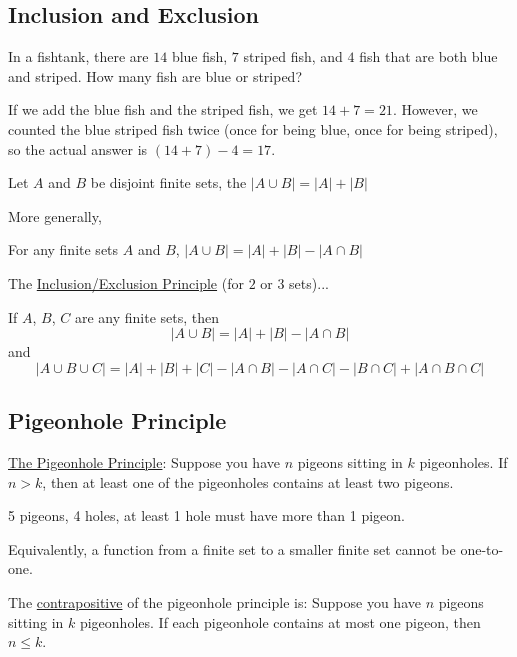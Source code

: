 \subsection{Inclusion and Exclusion}
\begin{example}
    In a fishtank, there are $14$ blue fish, $7$ striped fish, and $4$ fish that are both blue and striped. How many fish are blue or striped?

    If we add the blue fish and the striped fish, we get $14+7=21$. However, we counted the blue striped fish twice (once for being blue, once for being striped), so the actual answer is $(14+7)-4=17$.
\end{example}

\begin{theorm}
    Let $A$ and $B$ be disjoint finite sets, the $|A\cup B| = |A| + |B|$
\end{theorm}

More generally,
\begin{theorm}
    For any finite sets $A$ and $B$, $|A\cup B| = |A|+|B| - |A\cap B|$
\end{theorm}

\begin{definition}
    The \underline{Inclusion/Exclusion Principle} (for $2$ or $3$ sets)...

    If $A$, $B$, $C$ are any finite sets, then
    $$|A\cup B| = |A| + |B| - |A\cap B|$$
    and
    $$|A\cup B\cup C| = |A| + |B| + |C| - |A\cap B| - |A\cap C| - |B\cap C| + |A\cap B\cap C|$$
\end{definition}

\subsection{Pigeonhole Principle}
\begin{definition}
    \underline{The Pigeonhole Principle}: Suppose you have $n$ pigeons sitting in $k$ pigeonholes. If $n > k$, then at least one of the pigeonholes contains at least two pigeons.

    \begin{example}
        5 pigeons, 4 holes, at least 1 hole must have more than 1 pigeon.
    \end{example}

    Equivalently, a function from a finite set to a smaller finite set cannot be one-to-one.
\end{definition}

The \underline{contrapositive} of the pigeonhole principle is: Suppose you have $n$ pigeons sitting in $k$ pigeonholes. If each pigeonhole contains at most one pigeon, then $n\leq k$.

